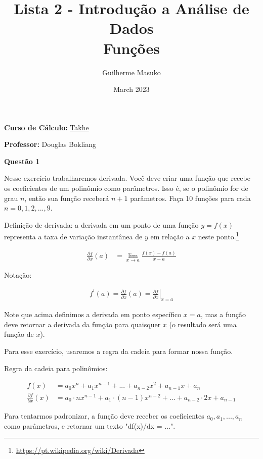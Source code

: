 \documentclass[12pt, a4paper]{article}
\title{Lista 2 - Introdução a Análise de Dados \\
	Funções}
\author{Guilherme Masuko}
\date{March 2023}
\begin{document}
	
\clearpage
\maketitle
\thispagestyle{empty}

\textbf{Curso de Cálculo:} \href{https://cursos.takhe.com.br/}{Takhe}

\textbf{Professor:} Douglas Bokliang

\vspace{1cm}


\textbf{Questão 1}

Nesse exercício trabalharemos derivada. Você deve criar uma função que recebe os coeficientes de um polinômio como parâmetros. Isso é, se o polinômio for de grau $n$, então sua função receberá $n+1$ parâmetros. Faça 10 funções para cada $n = 0, 1, 2,..., 9$. 

Definição de derivada: a derivada em um ponto de uma função $y = f(x)$ representa a taxa de variação instantânea de $y$ em relação a $x$ neste ponto.\footnote{\url{https://pt.wikipedia.org/wiki/Derivada}}

\begin{align*}
	\frac{\partial f}{\partial x}(a) &= \lim_{x \rightarrow a} \frac{f(x)-f(a)}{x-a}
\end{align*}

Notação:

\begin{align*}
	f^{\prime}(a)=\frac{\partial f}{\partial x}(a)=\left.\frac{\partial f}{\partial x}\right|_{x=a}
\end{align*}

Note que acima definimos a derivada em ponto específico $x=a$, mas a função deve retornar a derivada da função para quaisquer $x$ (o resultado será uma função de $x$).

Para esse exercício, usaremos a regra da cadeia para formar nossa função. 

Regra da cadeia para polinômios:

\begin{align*}
	f(x) &= a_0 x^n + a_{1} x^{n-1} + ... + a_{n-2} x^2 + a_{n-1} x + a_n \\
	\frac{\partial f}{\partial x}(x) &= a_0\cdot n x^{n-1} + a_1\cdot (n-1) x^{n-2} + ... + a_{n-2}\cdot 2 x + a_{n-1}
\end{align*}
	
	
Para tentarmos padronizar, a função deve receber os coeficientes $a_0, a_1, ..., a_n$ como parâmetros, e retornar um texto "df(x)/dx = ...".
\end{document}
